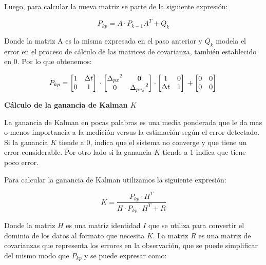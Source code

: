 Luego, para calcular la nueva matriz se parte de la siguiente expresión:

$$ P_{kp} = A \cdot P_{k-1} A^T + Q_k $$

Donde la matriz A es la misma expresada en el paso anterior y $Q_k$ modela el error en el proceso de cálculo de las matrices de covarianza, también establecido en $0$. Por lo que obtenemos:

$$ P_{kp} =
    \begin{bmatrix}
    1 & \Delta t  \\
    0 & 1         \\
    \end{bmatrix} \\
    \cdot 
    \begin{bmatrix}
    {\Delta_{px}}^2 & 0   \\
    0 & {\Delta_{pv_x}}^2 \\
    \end{bmatrix}
    \cdot
    \begin{bmatrix}
    1 & 0           \\
    \Delta t & 1    \\
    \end{bmatrix}   \\
    +
    \begin{bmatrix}
    0 & 0  \\
    0 & 0  \\
    \end{bmatrix}  \\
$$

\textbf{Cálculo de la ganancia de Kalman $K$} \mbox{} \vspace{8pt}

La ganancia de Kalman en pocas palabras es una media ponderada que le da mas o menos importancia a la medición versus la estimación según el error detectado. Si la ganancia $K$ tiende a 0, indica que el sistema no converge y que tiene un error considerable. Por otro lado si la ganancia $K$ tiende a 1 indica que tiene poco error.

Para calcular la ganancia de Kalman utilizamos la siguiente expresión:

$$ K = \frac{P_{kp} \cdot H^T}
            {H \cdot P_{kp} \cdot H^T + R}
$$

Donde la matriz $H$ es una matriz identidad $I$ que se utiliza para convertir el dominio de los datos al formato que necesita $K$. La matriz $R$ es una matriz de covarianzas que representa los errores en la observación, que se puede simplificar del mismo modo que $P_{kp}$ y se puede expresar como:

